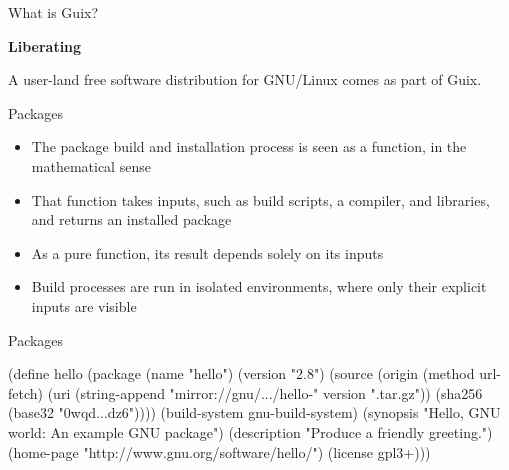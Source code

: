 \documentclass{beamer}
\begin{document}
\begin{frame}{What is Guix?}
  \begin{centering}
    \Huge{\textbf{Liberating}}
  \end{centering}

  \vspace{1cm}

  A user-land free software distribution for GNU/Linux comes as part
  of Guix.
\end{frame}

\begin{frame}{Packages}
  \begin{itemize}
  \item The package build and installation process is seen as a
    function, in the mathematical sense
  \item That function takes inputs, such as build scripts, a compiler,
    and libraries, and returns an installed package
  \item As a pure function, its result depends solely on its inputs
  \item Build processes are run in isolated environments, where only
    their explicit inputs are visible
  \end{itemize}
\end{frame}

\begin{frame}[fragile]{Packages}
  \scriptsize{\begin{semiverbatim}
(define hello
  (package
   (name "hello")
   (version "2.8")
   (source (origin
            (method url-fetch)
            (uri (string-append
                  "mirror://gnu/\textrm{...}/hello-" version
                  ".tar.gz"))
            (sha256 (base32 "0wqd\textrm{...}dz6"))))
   (build-system gnu-build-system)
   (synopsis "Hello, GNU world: An example GNU package")
   (description "Produce a friendly greeting.")
   (home-page "http://www.gnu.org/software/hello/")
   (license gpl3+)))
  \end{semiverbatim}}
\end{frame}
\end{document}
